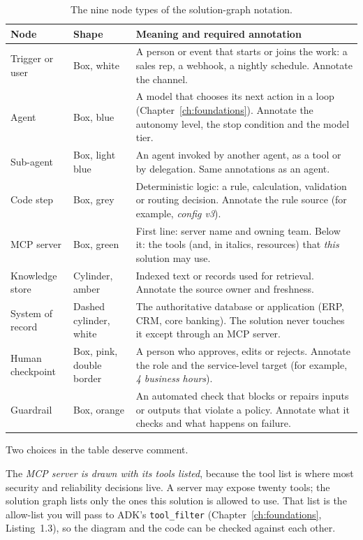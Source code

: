 \begin{table}[htbp]
\centering
\small
\caption{The nine node types of the solution-graph notation.}
\label{tab:nodes}
\begin{tabularx}{\textwidth}{@{}>{\raggedright\arraybackslash}p{2.3cm}>{\raggedright\arraybackslash}p{3.1cm}>{\raggedright\arraybackslash}X@{}}
\toprule
Node & Shape & Meaning and required annotation \\
\midrule
Trigger or user & Box, white & A person or event that starts or joins the work: a sales rep, a webhook, a nightly schedule. Annotate the channel. \\
Agent & Box, blue & A model that chooses its next action in a loop (Chapter~\ref{ch:foundations}). Annotate the autonomy level, the stop condition and the model tier. \\
Sub-agent & Box, light blue & An agent invoked by another agent, as a tool or by delegation. Same annotations as an agent. \\
Code step & Box, grey & Deterministic logic: a rule, calculation, validation or routing decision. Annotate the rule source (for example, \emph{config v3}). \\
MCP server & Box, green & First line: server name and owning team. Below it: the tools (and, in italics, resources) that \emph{this} solution may use. \\
Knowledge store & Cylinder, amber & Indexed text or records used for retrieval. Annotate the source owner and freshness. \\
System of record & Dashed cylinder, white & The authoritative database or application (ERP, CRM, core banking). The solution never touches it except through an MCP server. \\
Human checkpoint & Box, pink, double border & A person who approves, edits or rejects. Annotate the role and the service-level target (for example, \emph{4 business hours}). \\
Guardrail & Box, orange & An automated check that blocks or repairs inputs or outputs that violate a policy. Annotate what it checks and what happens on failure. \\
\bottomrule
\end{tabularx}
\end{table}

Two choices in the table deserve comment.

The \emph{MCP server is drawn with its tools listed}, because the tool list is where most security and reliability decisions live. A server may expose twenty tools; the solution graph lists only the ones this solution is allowed to use. That list is the allow-list you will pass to ADK's \texttt{tool\_filter} (Chapter~\ref{ch:foundations}, Listing~1.3), so the diagram and the code can be checked against each other.

